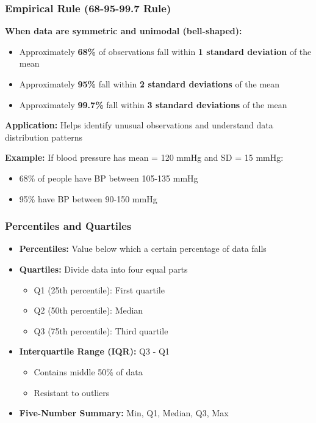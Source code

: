 \documentclass{beamer}
\begin{document}
\begin{frame}
\frametitle{Empirical Rule (68-95-99.7 Rule)}
\textbf{When data are symmetric and unimodal (bell-shaped):}

\vspace{0.3cm}
\begin{itemize}
\item Approximately \textbf{68\%} of observations fall within \textbf{1 standard deviation} of the mean
\item Approximately \textbf{95\%} fall within \textbf{2 standard deviations} of the mean
\item Approximately \textbf{99.7\%} fall within \textbf{3 standard deviations} of the mean
\end{itemize}

\vspace{0.3cm}
\textbf{Application:} Helps identify unusual observations and understand data distribution patterns

\vspace{0.3cm}
\textbf{Example:} If blood pressure has mean = 120 mmHg and SD = 15 mmHg:
\begin{itemize}
\item 68\% of people have BP between 105-135 mmHg
\item 95\% have BP between 90-150 mmHg
\end{itemize}
\end{frame}

\begin{frame}
\frametitle{Percentiles and Quartiles}
\begin{itemize}
\item \textbf{Percentiles:} Value below which a certain percentage of data falls
\item \textbf{Quartiles:} Divide data into four equal parts
  \begin{itemize}
  \item Q1 (25th percentile): First quartile
  \item Q2 (50th percentile): Median
  \item Q3 (75th percentile): Third quartile
  \end{itemize}
\item \textbf{Interquartile Range (IQR):} Q3 - Q1
  \begin{itemize}
  \item Contains middle 50\% of data
  \item Resistant to outliers
  \end{itemize}
\item \textbf{Five-Number Summary:} Min, Q1, Median, Q3, Max
\end{itemize}
\end{frame}
\end{document}
